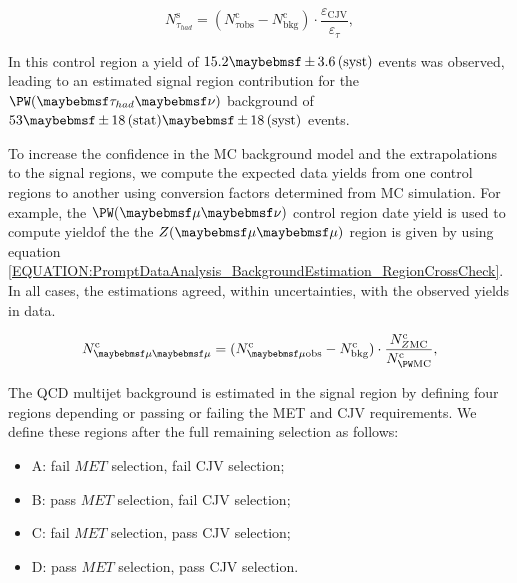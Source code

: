 \begin{equation}
N^\mathrm{s}_{\tau_{had}} = (N^\mathrm{c}_{\tau\text{obs}} - N^\mathrm{c}_\text{bkg}) \cdot \frac{\varepsilon_\mathrm{CJV}}{\varepsilon_{\tau}},
\label{EQUATION:PromptDataAnalysis_BackgroundEstimation_WTau}
\end{equation}
 
In this control region a yield of $15.2 \pm 3.6\syst$ events was observed, leading to an estimated signal region contribution for the $\PW (\tau_{had} \nu)$ background of $53 \pm 18\stat \pm 18\syst$ events.

To increase the confidence in the \gls{MC} background model and the extrapolations to the signal regions, we compute the expected data yields from one control regions to another using conversion factors determined from \gls{MC} simulation. For example, the $\PW (\mu \nu)$ control region date yield is used to compute yieldof the the $\Z (\mu \mu)$ region is given by using equation \ref{EQUATION:PromptDataAnalysis_BackgroundEstimation_RegionCrossCheck}. In all cases, the estimations agreed, within uncertainties, with the observed yields in data. 

\begin{equation}
N^\mathrm{c}_{\mu \mu} = (N^\mathrm{c}_{\mu \text{obs}} - N^\mathrm{c}_\text{bkg}) \cdot \frac{N^\mathrm{c}_{\Z \mathrm{MC}}}{N^\mathrm{c}_{\PW \mathrm{MC}}},
\label{EQUATION:PromptDataAnalysis_BackgroundEstimation_RegionCrossCheck}
\end{equation}

The \gls{QCD} multijet background is estimated in the signal region by defining four regions depending or passing or failing the \gls{MET} and \gls{CJV} requirements. We define these regions after the full remaining selection as follows:

\begin{itemize}
  \item{A: fail $MET$ selection, fail \gls{CJV} selection;}
  \item{B: pass $MET$ selection, fail \gls{CJV} selection;}
  \item{C: fail $MET$ selection, pass \gls{CJV} selection;}
  \item{D: pass $MET$ selection, pass \gls{CJV} selection.}
\end{itemize}

